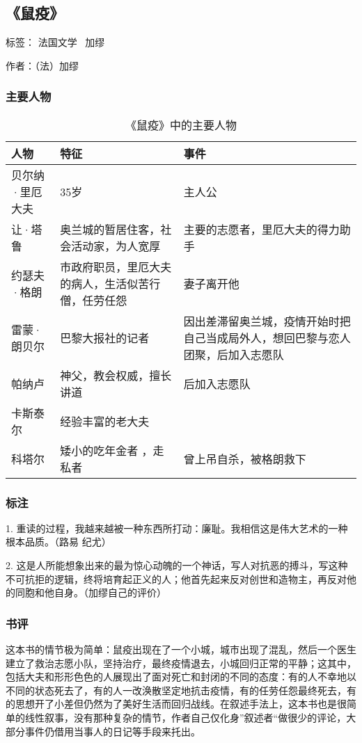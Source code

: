 \subsection{《鼠疫》}

标签： 法国文学 \  加缪

作者：（法）加缪

\subsubsection{主要人物}

\begin{table}[htpb]
    \centering
    \caption{《鼠疫》中的主要人物}
    \begin{tabular}{l|p{}|p{}}
人物 & 特征 & 事件 \\
\hline
贝尔纳·里厄大夫 & 35岁 & 主人公 \\ 
让·塔鲁 & 奥兰城的暂居住客，社会活动家，为人宽厚 & 主要的志愿者，里厄大夫的得力助手 \\
约瑟夫·格朗 & 市政府职员，里厄大夫的病人，生活似苦行僧，任劳任怨 & 妻子离开他 \\
雷蒙·朗贝尔 & 巴黎大报社的记者 & 因出差滞留奥兰城，疫情开始时把自己当成局外人，想回巴黎与恋人团聚，后加入志愿队 \\
帕纳卢 & 神父，教会权威，擅长讲道 & 后加入志愿队 \\
卡斯泰尔 & 经验丰富的老大夫 &  \\
科塔尔 & 矮小的吃年金者 ，走私者 & 曾上吊自杀，被格朗救下 \\
\hline
    \end{tabular}
\end{table}

\subsubsection{标注}

1. 重读的过程，我越来越被一种东西所打动：廉耻。我相信这是伟大艺术的一种根本品质。（路易 纪尤）

2. 这是人所能想象出来的最为惊心动魄的一个神话，写人对抗恶的搏斗，写这种不可抗拒的逻辑，终将培育起正义的人；他首先起来反对创世和造物主，再反对他的同胞和他自身。（加缪自己的评价）



\subsubsection{书评}
这本书的情节极为简单：鼠疫出现在了一个小城，城市出现了混乱，然后一个医生建立了救治志愿小队，坚持治疗，最终疫情退去，小城回归正常的平静；这其中，包括大夫和形形色色的人展现出了面对死亡和封闭的不同的态度：有的人不幸地以不同的状态死去了，有的人一改涣散坚定地抗击疫情，有的任劳任怨最终死去，有的思想开了小差但仍然为了美好生活而回归战线。在叙述手法上，这本书也是很简单的线性叙事，没有那种复杂的情节，作者自己仅化身”叙述者“做很少的评论，大部分事件仍借用当事人的日记等手段来托出。


